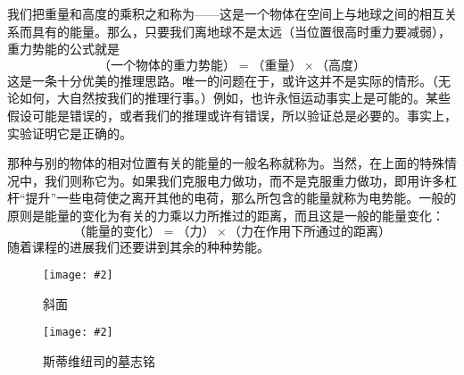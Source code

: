 \documentclass[12pt,oneside]{book}
\newenvironment{fig}[2][1]
{\begin{figure}[H]
\centering
\texttt{[image: \#2]}}
{\end{figure}}
\begin{document}
我们把重量和高度的乘积之和称为——这是一个物体在空间上与地球之间的相互关系而具有的能量。那么，只要我们离地球不是太远（当位置很高时重力要减弱），重力势能的公式就是
\begin{equation}
\label{Eq:I:4:3}
\text{（一个物体的重力势能）}=
\text{（重量）}\times\text{（高度）}
\end{equation}
这是一条十分优美的推理思路。唯一的问题在于，或许这并不是实际的情形。（无论如何，大自然按我们的推理行事。）例如，也许永恒运动事实上是可能的。某些假设可能是错误的，或者我们的推理或许有错误，所以验证总是必要的。事实上，实验证明它是正确的。

那种与别的物体的相对位置有关的能量的一般名称就称为。当然，在上面的特殊情况中，我们则称它为。如果我们克服电力做功，而不是克服重力做功，即用许多杠杆“提升”一些电荷使之离开其他的电荷，那么所包含的能量就称为电势能。一般的原则是能量的变化为有关的力乘以力所推过的距离，而且这是一般的能量变化：
\begin{equation}
\label{Eq:I:4:4}
\text{（能量的变化）}=
\text{（力）}\times\text{（力在作用下所通过的距离）}
\end{equation}
随着课程的进展我们还要讲到其余的种种势能。
\begin{fig}{斜面}
\caption{斜面}
\label{fig:斜面}
\end{fig}

\begin{fig}{斯蒂维纽司的墓志铭}
\caption{斯蒂维纽司的墓志铭}
\label{fig:斯蒂维纽司的墓志铭}
\end{fig}
\end{document}
